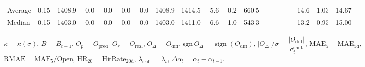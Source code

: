 \begin{threeparttable}
{\begin{tabular}{lrrrrrrrrrrrrrrrrr}
Average &     0.15 & 1408.9 &              -0.0 &              -0.0 &               -0.0 &               -0.0 & 1408.9 & 1414.5 &       -5.6 &                     -0.2 &               660.5 &         -- &        -- &             -- &             14.6 &            1.03 &                  14.67 \\
 Median &     0.15 & 1403.0 &               0.0 &               0.0 &                0.0 &                0.0 & 1403.0 & 1411.0 &       -6.6 &                     -1.0 &               543.3 &         -- &        -- &             -- &             13.2 &            0.93 &                  15.00 \\
\bottomrule
\end{tabular}
}
\begin{tablenotes}\footnotesize
\item $\kappa=\kappa(\sigma)$, $B=B_{t-1}$, $O_p=O_{\text{pred}}$, $O_r=O_{\text{real}}$, $O_\Delta=O_{\text{diff}}$, $\mathrm{sgn}\,O_\Delta=\operatorname{sign}(O_{\text{diff}})$, $|O_\Delta|/\sigma=\dfrac{|O_{\text{diff}}|}{\sigma_t^{\text{shift}}}$, $\mathrm{MAE}_5=\mathrm{MAE}_{5\text{d}}$, $\mathrm{RMAE}= \mathrm{MAE}_5 / \text{Open}$, $\mathrm{HR}_{20}=\mathrm{HitRate}_{20\text{d}}$, 
$\lambda_{\text{shift}}=\lambda_t$, 
$\Delta\alpha_t=\alpha_t-\alpha_{t-1}$.
\end{tablenotes}
\end{threeparttable}
\endgroup

